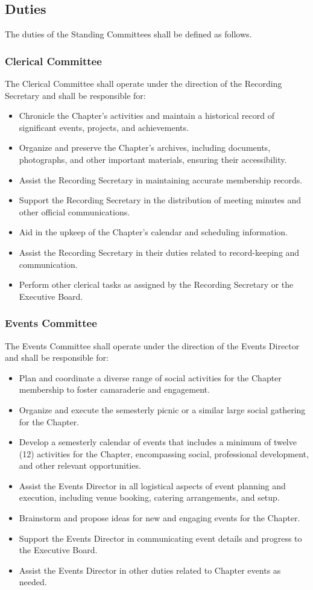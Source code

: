 \documentclass[10pt, oneside]{article}
\begin{document}
\subsection{Duties}
The duties of the Standing Committees shall be defined as follows.

\subsubsection{Clerical Committee}
The Clerical Committee shall operate under the direction of the Recording Secretary and shall be responsible for:
\begin{itemize}
    \item Chronicle the Chapter's activities and maintain a historical record of significant events, projects, and achievements.
    \item Organize and preserve the Chapter's archives, including documents, photographs, and other important materials, ensuring their accessibility.
    \item Assist the Recording Secretary in maintaining accurate membership records.
    \item Support the Recording Secretary in the distribution of meeting minutes and other official communications.
    \item Aid in the upkeep of the Chapter's calendar and scheduling information.
    \item Assist the Recording Secretary in their duties related to record-keeping and communication.
    \item Perform other clerical tasks as assigned by the Recording Secretary or the Executive Board.
\end{itemize}

\subsubsection{Events Committee}
The Events Committee shall operate under the direction of the Events Director and shall be responsible for:
\begin{itemize}
    \item Plan and coordinate a diverse range of social activities for the Chapter membership to foster camaraderie and engagement.
    \item Organize and execute the semesterly picnic or a similar large social gathering for the Chapter.
    \item Develop a semesterly calendar of events that includes a minimum of twelve (12) activities for the Chapter, encompassing social, professional development, and other relevant opportunities.
    \item Assist the Events Director in all logistical aspects of event planning and execution, including venue booking, catering arrangements, and setup.
    \item Brainstorm and propose ideas for new and engaging events for the Chapter.
    \item Support the Events Director in communicating event details and progress to the Executive Board.
    \item Assist the Events Director in other duties related to Chapter events as needed.
\end{itemize}
\end{document}
